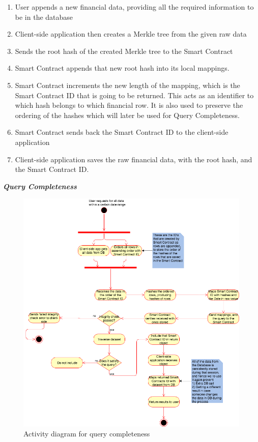 \begin{enumerate}
\item User appends a new financial data, providing all the required information to be in the database
\item Client-side application then creates a Merkle tree from the given raw data
\item Sends the root hash of the created Merkle tree to the Smart Contract 
\item Smart Contract appends that new root hash into its local mappings. 
\item Smart Contract increments the new length of the mapping, which is the Smart Contract ID that is going to be returned. This acts as an identifier to which hash belongs to which financial row. It is also used to preserve the ordering of the hashes which will later be used for Query Completeness. 
\item Smart Contract sends back the Smart Contract ID to the client-side application
\item Client-side application saves the raw financial data, with the root hash, and the Smart Contract ID. 
\end{enumerate}

\textbf{\textit{Query Completeness}}

\begin{figure}[h]%
\centering
\includegraphics[width=1.0\textwidth]{images/queryCompleteness.png}
\caption{\label{fig:queryCompleteness}Activity diagram for query completeness}
\end{figure}


